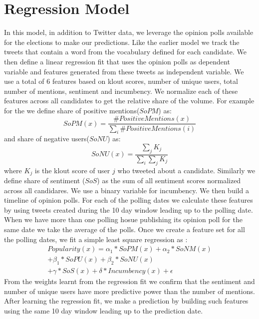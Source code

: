 \section{Regression Model}
In this model, in addition to Twitter data, we leverage the opinion polls available for the elections to make our predictions.
Like the earlier model we track the tweets that contain a word from the vocabulary defined for each candidate.
We then define a linear regression fit that uses the opinion polls as dependent variable and features generated from these tweets as independent variable.
We use a total of 6 features based on klout scores, number of unique users, total number of mentions, sentiment and incumbency.
We normalize each of these features across all candidates to get the relative share of the volume. 
For example for the we define share of positive mentions($SoPM$)  as: 
\begin{equation}
SoPM(x) = \frac{\#PositiveMentions(x)}{\sum_i \#PositiveMentions(i)} 
\end{equation}
and share of negative users($SoNU$) as:
\begin{equation}
SoNU(x) = \frac{\sum_j K_j}{\sum_i \sum_j K_j}
\end{equation}
where $K_j$ is the klout score of user $j$ who tweeted about a candidate.
Similarly we define share of sentiment ($SoS$) as the sum of all sentiment scores normalized across all candidares. 
We use a binary variable for incumbency. 
We then build a timeline of opinion polls. 
For each of the polling dates we calculate these features by using tweets created during the 10 day window leading up to the polling date.
When we have more than one polling hosue publishing its opinion poll for the same date we take the average of the polls. 
Once we create a feature set for all the polling dates, we fit a simple least square regression as :
\begin{equation}
\begin{split}
Popularity(x) = \alpha_1 * SoPM(x) + \alpha_2 * SoNM(x) \\
						 + \beta_1 * SoPU(x) + \beta_2 * SoNU(x) \\
						 + \gamma * SoS(x) + \delta * Incumbency(x) + \epsilon
\end{split}
\end{equation}
From the  weights learnt from the regression fit we confirm that the sentiment and number of unique users have more predictive power than the number of mentions.	
After learning the regression fit, we make a prediction by building such features using the same 10 day window leading up to the prediction date.

